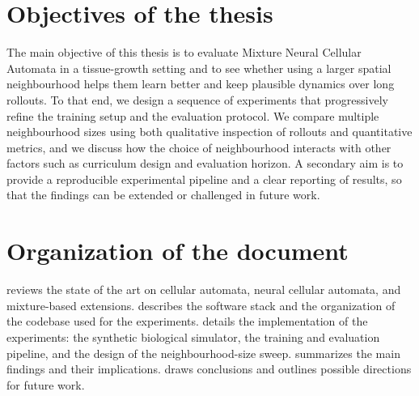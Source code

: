 \section{Objectives of the thesis}
\label{sec:intro:objectives}

The main objective of this thesis is to evaluate Mixture Neural Cellular Automata in a tissue-growth setting and to see whether using a larger spatial neighbourhood helps them learn better and keep plausible dynamics over long rollouts.
To that end, we design a sequence of experiments that progressively refine the training setup and the evaluation protocol.
We compare multiple neighbourhood sizes using both qualitative inspection of rollouts and quantitative metrics, and we discuss how the choice of neighbourhood interacts with other factors such as curriculum design and evaluation horizon.
A secondary aim is to provide a reproducible experimental pipeline and a clear reporting of results, so that the findings can be extended or challenged in future work.

\section{Organization of the document}
\label{sec:intro:organization}

 reviews the state of the art on cellular automata, neural cellular automata, and mixture-based extensions.
 describes the software stack and the organization of the codebase used for the experiments.
 details the implementation of the experiments: the synthetic biological simulator, the training and evaluation pipeline, and the design of the neighbourhood-size sweep.
 summarizes the main findings and their implications.
 draws conclusions and outlines possible directions for future work.
